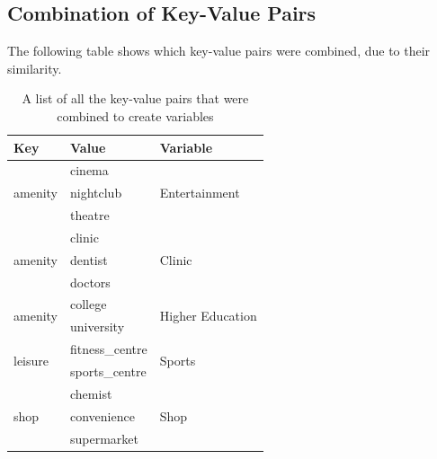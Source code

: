 \subsection*{Combination of Key-Value Pairs}
The following table shows which key-value pairs were combined, due to their similarity.
\begin{table}[H]
\caption{A list of all the key-value pairs that were combined to create variables \label{OSM_3}}
\begin{tabular}{l l l}
\toprule
\textbf{Key} & \textbf{Value} & \textbf{Variable} \\
\midrule
\multirow{3}{*}{amenity} & cinema & \multirow{3}{*}{Entertainment} \\
& nightclub \\
& theatre \\
\midrule
\multirow{3}{*}{amenity} & clinic & \multirow{3}{*}{Clinic} \\
& dentist \\
& doctors \\
\midrule
\multirow{2}{*}{amenity} & college & \multirow{2}{*}{Higher Education} \\
& university \\
\midrule
\multirow{2}{*}{leisure} & fitness\_centre & \multirow{2}{*}{Sports} \\
& sports\_centre \\
\midrule
\multirow{3}{*}{shop} & chemist & \multirow{3}{*}{Shop} \\
& convenience \\
& supermarket \\
\bottomrule
\end{tabular}
\end{table}
\clearpage
